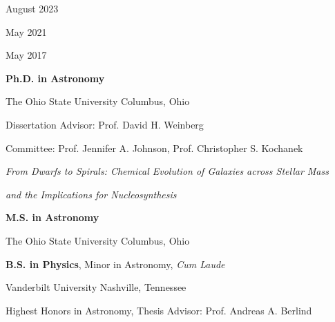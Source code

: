 \documentclass[cv.tex]{subfiles}
\begin{document}
\vspace{-4mm}
\par
\noindent
\parbox{0.18\textwidth}{%
	\vspace{-1mm}
	\raggedleft
	August 2023 \par
	\null \par
	\null \par
	\null \par
	\null \par
	\null \par
	May 2021 \par
	\null \par
	May 2017 \par
	\null \par
	\null \par
}
\hspace{1mm}
\parbox{0.8\textwidth}{%
	\textbf{Ph.D. in Astronomy} \par
	The Ohio State University \hfill Columbus, Ohio \par
	Dissertation Advisor: Prof. David H. Weinberg \par
	Committee: Prof. Jennifer A. Johnson, Prof. Christopher S. Kochanek \par
	\textit{From Dwarfs to Spirals: Chemical Evolution of
	Galaxies across Stellar Mass} \par
	\textit{and the Implications for Nucleosynthesis} \par
	\textbf{M.S. in Astronomy} \par
	The Ohio State University \hfill Columbus, Ohio \par
	\textbf{B.S. in Physics}, Minor in Astronomy, \textit{Cum Laude} \par
	Vanderbilt University \hfill Nashville, Tennessee \par
	Highest Honors in Astronomy, Thesis Advisor: Prof. Andreas A. Berlind \par
}
\end{document}
